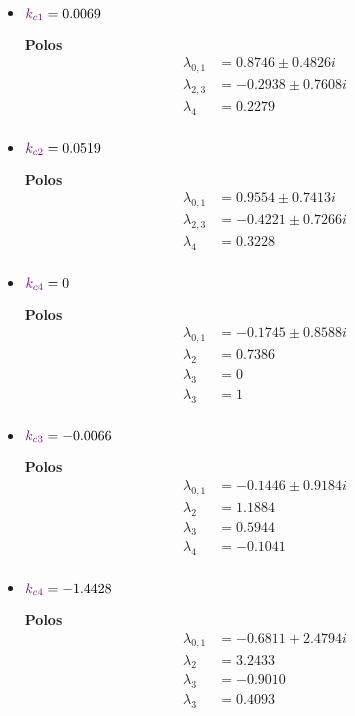 \begin{multicols}{2}
  \begin{itemize}
      \item \(\mathbin{\color{violet}k_{c1}} = 0.0069  \) 

        \textbf{Polos}
        \begin{align}
        \lambda_{0,1} &= 0.8746 \pm 0.4826i\\
        \lambda_{2,3} &= -0.2938 \pm 0.7608i \\
        \lambda_{4} &= 0.2279 \\
        \end{align}

      \item \(\mathbin{\color{violet}k_{c2}} = 0.0519\)

      \textbf{Polos}
      \begin{align}
        \lambda_{0,1} &= 0.9554 \pm 0.7413i \\
        \lambda_{2,3} &= -0.4221 \pm 0.7266i\\
        \lambda_{4} &= 0.3228 \\
        \end{align}
        
    \item \(\mathbin{\color{violet}k_{c4}} = 0\)

    \textbf{Polos}
    \begin{align}
      \lambda_{0,1} &= -0.1745 \pm 0.8588i \\
      \lambda_{2} &= 0.7386  \\
      \lambda_{3} &= 0  \\
      \lambda_{3} &= 1  \\
    \end{align}
        
  \end{itemize}
  \columnbreak
  \begin{itemize}
      \item \(\mathbin{\color{violet}k_{c3}} = -0.0066\)

      \textbf{Polos}
      \begin{align}
        \lambda_{0,1} &= -0.1446 \pm 0.9184i \\
        \lambda_{2} &= 1.1884 \\
        \lambda_{3} &= 0.5944 \\
        \lambda_{4} &= -0.1041\\
        \end{align}

      \item \(\mathbin{\color{violet}k_{c4}} = -1.4428\)

      \textbf{Polos}
      \begin{align}
        \lambda_{0,1} &= -0.6811 + 2.4794i \\
        \lambda_{2} &= 3.2433  \\
        \lambda_{3} &= -0.9010  \\
        \lambda_{3} &= 0.4093  \\
        \end{align}

        
  \end{itemize}
\end{multicols}



